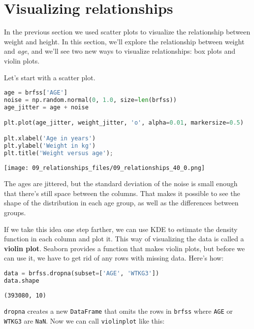 \section{Visualizing relationships}\label{visualizing-relationships}

In the previous section we used scatter plots to visualize the
relationship between weight and height. In this section, we'll explore
the relationship between weight and \emph{age}, and we'll see two new
ways to visualize relationships: box plots and violin plots.

Let's start with a scatter plot.

\begin{lstlisting}[language=Python,style=source]
age = brfss['AGE']
noise = np.random.normal(0, 1.0, size=len(brfss))
age_jitter = age + noise

plt.plot(age_jitter, weight_jitter, 'o', alpha=0.01, markersize=0.5)

plt.xlabel('Age in years')
plt.ylabel('Weight in kg')
plt.title('Weight versus age');
\end{lstlisting}

\begin{center}
\texttt{[image: 09\_relationships\_files/09\_relationships\_40\_0.png]}
\end{center}

The ages are jittered, but the standard deviation of the noise is small
enough that there's still space between the columns. That makes it
possible to see the shape of the distribution in each age group, as well
as the differences between groups.

If we take this idea one step farther, we can use KDE to estimate the
density function in each column and plot it. This way of visualizing the
data is called a \textbf{violin plot}. Seaborn provides a function that
makes violin plots, but before we can use it, we have to get rid of any
rows with missing data. Here's how:

\begin{lstlisting}[language=Python,style=source]
data = brfss.dropna(subset=['AGE', 'WTKG3'])
data.shape
\end{lstlisting}

\begin{lstlisting}[style=output]
(393080, 10)
\end{lstlisting}

\passthrough{\lstinline!dropna!} creates a new
\passthrough{\lstinline!DataFrame!} that omits the rows in
\passthrough{\lstinline!brfss!} where \passthrough{\lstinline!AGE!} or
\passthrough{\lstinline!WTKG3!} are \passthrough{\lstinline!NaN!}. Now
we can call \passthrough{\lstinline!violinplot!} like this:

